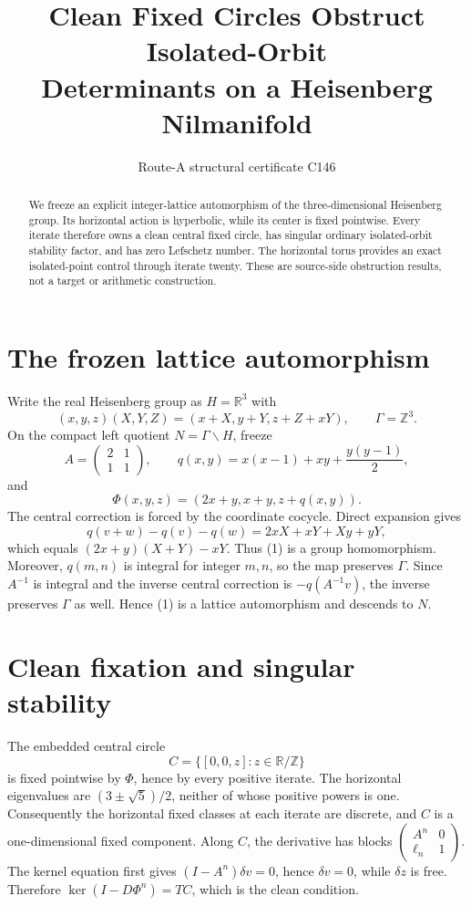 \documentclass[10pt]{article}
\title{Clean Fixed Circles Obstruct Isolated-Orbit\\
Determinants on a Heisenberg Nilmanifold}
\author{Route-A structural certificate C146}
\date{}
\begin{document}
\maketitle

\begin{abstract}
We freeze an explicit integer-lattice automorphism of the three-dimensional
Heisenberg group.  Its horizontal action is hyperbolic, while its center is
fixed pointwise.  Every iterate therefore owns a clean central fixed circle,
has singular ordinary isolated-orbit stability factor, and has zero Lefschetz
number.  The horizontal torus provides an exact isolated-point control through
iterate twenty.  These are source-side obstruction results, not a target or
arithmetic construction.
\end{abstract}

\section{The frozen lattice automorphism}
Write the real Heisenberg group as $H=\mathbb R^3$ with
\[
(x,y,z)(X,Y,Z)=(x+X,y+Y,z+Z+xY),
\qquad \Gamma=\mathbb Z^3.
\]
On the compact left quotient $N=\Gamma\backslash H$, freeze
\[
A=\begin{pmatrix}2&1\\1&1\end{pmatrix},\qquad
q(x,y)=x(x-1)+xy+\frac{y(y-1)}2,
\]
and
\begin{equation}
\Phi(x,y,z)=(2x+y,x+y,z+q(x,y)).                 \tag{1}
\end{equation}
The central correction is forced by the coordinate cocycle.  Direct expansion
gives
\[
q(v+w)-q(v)-q(w)=2xX+xY+Xy+yY,
\]
which equals $(2x+y)(X+Y)-xY$.  Thus (1) is a group homomorphism.
Moreover, $q(m,n)$ is integral for integer $m,n$, so the map preserves
$\Gamma$.  Since $A^{-1}$ is integral and the inverse central correction is
$-q(A^{-1}v)$, the inverse preserves $\Gamma$ as well.  Hence (1) is a lattice
automorphism and descends to $N$.

\section{Clean fixation and singular stability}
The embedded central circle
\[
C=\{[0,0,z]:z\in\mathbb R/\mathbb Z\}
\]
is fixed pointwise by $\Phi$, hence by every positive iterate.  The horizontal
eigenvalues are $(3\pm\sqrt5)/2$, neither of whose positive powers is one.
Consequently the horizontal fixed classes at each iterate are discrete, and
$C$ is a one-dimensional fixed component.  Along $C$, the derivative has
blocks $\left(\begin{smallmatrix}A^n&0\\ \ell_n&1\end{smallmatrix}\right)$.
The kernel equation first gives $(I-A^n)\delta v=0$, hence $\delta v=0$,
while $\delta z$ is free.  Therefore $\ker(I-D\Phi^n)=T C$, which is the
clean condition.
\end{document}

